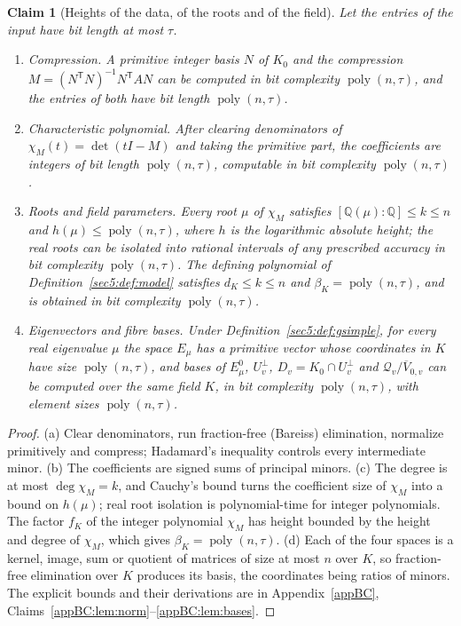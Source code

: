 \documentclass[journal]{IEEEtran}
\theoremstyle{plainn}
\newtheorem{claim}{Claim}
\theoremstyle{remark}
\newcommand{\poly}{\operatorname{poly}}
\begin{document}
\begin{claim}[Heights of the data, of the roots and of the field]\label{sec5:lem:height}\label{sec5:lem:charpoly}\label{sec5:lem:roots}\label{sec5:lem:eigvec}
Let the entries of the input have bit length at most $\tau$.
\begin{enumerate}[label=(\alph*),leftmargin=*]
\item \emph{Compression.} A primitive integer basis $N$ of $K_0$ and the compression
$M=(N^{\mathsf T}N)^{-1}N^{\mathsf T}AN$ can be computed in bit complexity $\poly(n,\tau)$, and the
entries of both have bit length $\poly(n,\tau)$.
\item \emph{Characteristic polynomial.} After clearing denominators of $\chi_M(t)=\det(tI-M)$ and
taking the primitive part, the coefficients are integers of bit length $\poly(n,\tau)$, computable in
bit complexity $\poly(n,\tau)$.
\item \emph{Roots and field parameters.} Every root $\mu$ of $\chi_M$ satisfies
$[\mathbb{Q}(\mu):\mathbb{Q}]\le k\le n$ and $h(\mu)\le\poly(n,\tau)$, where $h$ is the logarithmic
absolute height; the real roots can be isolated into rational intervals of any prescribed accuracy in
bit complexity $\poly(n,\tau)$. The defining polynomial of Definition~\ref{sec5:def:model} satisfies
$d_K\le k\le n$ and $\beta_K=\poly(n,\tau)$, and is obtained in bit complexity $\poly(n,\tau)$.
\item \emph{Eigenvectors and fibre bases.} Under Definition~\ref{sec5:def:gsimple}, for every real
eigenvalue $\mu$ the space $E_\mu$ has a primitive vector whose coordinates in $K$ have size
$\poly(n,\tau)$, and bases of $E_\mu^0$, $U_v^\perp$, $D_v=K_0\cap U_v^\perp$ and
$\mathcal{Q}_v/\overline{V}_{0,v}$ can be computed over the same field $K$, in bit complexity
$\poly(n,\tau)$, with element sizes $\poly(n,\tau)$.
\end{enumerate}
\end{claim}

\begin{proof}
(a) Clear denominators, run fraction-free (Bareiss) elimination, normalize primitively and compress;
Hadamard's inequality controls every intermediate minor. (b) The coefficients are signed sums of
principal minors. (c) The degree is at most $\deg\chi_M=k$, and Cauchy's bound turns the coefficient
size of $\chi_M$ into a bound on $h(\mu)$; real root isolation is polynomial-time for integer
polynomials. The factor $f_K$ of the integer polynomial $\chi_M$ has height bounded by the height and
degree of $\chi_M$, which gives $\beta_K=\poly(n,\tau)$. (d) Each of the four spaces is a kernel, image,
sum or quotient of matrices of size at most $n$ over $K$, so fraction-free elimination over $K$
produces its basis, the coordinates being ratios of minors. The explicit bounds and their derivations
are in Appendix~\ref{appBC}, Claims~\ref{appBC:lem:norm}--\ref{appBC:lem:bases}.
\end{proof}
\end{document}
